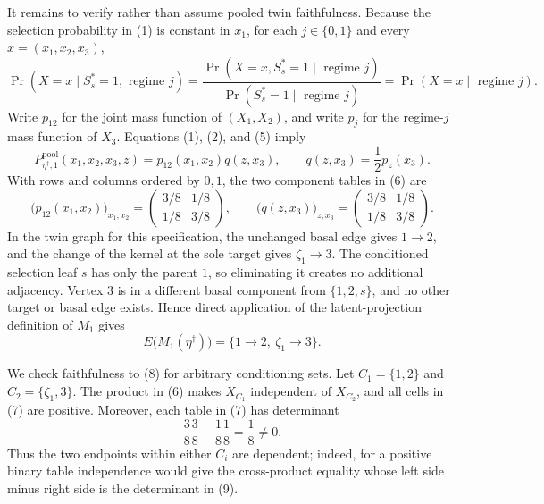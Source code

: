 It remains to verify rather than assume pooled twin faithfulness.  Because the selection probability in (1) is constant in \(x_1\), for each \(j\in\{0,1\}\) and every \(x=(x_1,x_2,x_3)\),
\[
 \Pr(X=x\mid S_s^*=1,\text{ regime }j)
 =\frac{\Pr(X=x, S_s^*=1\mid\text{ regime }j)}
        {\Pr(S_s^*=1\mid\text{ regime }j)}
 =\Pr(X=x\mid\text{ regime }j).
 \tag{5}
\]
Write \(p_{12}\) for the joint mass function of \((X_1,X_2)\), and write \(p_j\) for the regime-\(j\) mass function of \(X_3\).  Equations (1), (2), and (5) imply
\[
 P_{\eta^\dagger,1}^{\mathrm{pool}}(x_1,x_2,x_3,z)
 =p_{12}(x_1,x_2)q(z,x_3),
 \qquad
 q(z,x_3)=\frac12p_z(x_3).
 \tag{6}
\]
With rows and columns ordered by \(0,1\), the two component tables in (6) are
\[
 \bigl(p_{12}(x_1,x_2)\bigr)_{x_1,x_2}
 =
 \begin{pmatrix}3/8&1/8\\[2pt]1/8&3/8\end{pmatrix},
 \qquad
 \bigl(q(z,x_3)\bigr)_{z,x_3}
 =
 \begin{pmatrix}3/8&1/8\\[2pt]1/8&3/8\end{pmatrix}.
 \tag{7}
\]
In the twin graph for this specification, the unchanged basal edge gives \(1\to2\), and the change of the kernel at the sole target gives \(\zeta_1\to3\).  The conditioned selection leaf \(s\) has only the parent \(1\), so eliminating it creates no additional adjacency.  Vertex \(3\) is in a different basal component from \(\{1,2,s\}\), and no other target or basal edge exists.  Hence direct application of the latent-projection definition of \(M_1\) gives
\[
 E\bigl(M_1(\eta^\dagger)\bigr)
 =\{1\to2,\ \zeta_1\to3\}.
 \tag{8}
\]

We check faithfulness to (8) for arbitrary conditioning sets.  Let \(C_1=\{1,2\}\) and \(C_2=\{\zeta_1,3\}\).  The product in (6) makes \(X_{C_1}\) independent of \(X_{C_2}\), and all cells in (7) are positive.  Moreover, each table in (7) has determinant
\[
 \frac{3}{8}\frac{3}{8}-\frac{1}{8}\frac{1}{8}
 =\frac18\ne0.
 \tag{9}
\]
Thus the two endpoints within either \(C_i\) are dependent; indeed, for a positive binary table independence would give the cross-product equality whose left side minus right side is the determinant in (9).

